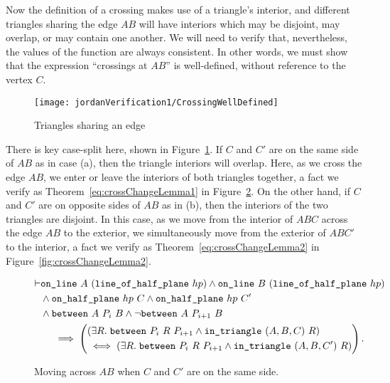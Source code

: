 Now the definition of a crossing makes use of a triangle's interior, and different triangles sharing the edge $AB$ will have interiors which may be disjoint, may overlap, or may contain one another. We will need to verify that, nevertheless, the values of the function  are always consistent. In other words, we must show that the expression ``crossings at $AB$'' is well-defined, without reference to the vertex $C$.

\begin{figure}
\centering\texttt{[image: jordanVerification1/CrossingWellDefined]}
\caption{Triangles sharing an edge}
\label{fig:CrossingWellDefined}
\end{figure}

There is key case-split here, shown in Figure~\ref{fig:CrossingWellDefined}. If $C$ and $C'$ are on the same side of $AB$ as in case (a), then the triangle interiors will overlap. Here, as we cross the edge $AB$, we enter or leave the interiors of both triangles together, a fact we verify as Theorem~\ref{eq:crossChangeLemma1} in Figure~\ref{fig:crossChangeLemma1}. On the other hand, if $C$ and $C'$ are on opposite sides of $AB$ as in (b), then the interiors of the two triangles are disjoint. In this case, as we move from the interior of $ABC$ across the edge $AB$ to the exterior, we simultaneously move from the exterior of $ABC'$ to the interior, a fact we verify as Theorem~\ref{eq:crossChangeLemma2} in Figure~\ref{fig:crossChangeLemma2}.

\begin{figure}
\begin{multline}\label{eq:crossChangeLemma1}
  \begin{aligned}
    \vdash&\texttt{on\_line}\ A\ (\texttt{line\_of\_half\_plane}\ hp) \wedge \texttt{on\_line}\ B\ (\texttt{line\_of\_half\_plane}\ hp)\\
    &\wedge\texttt{on\_half\_plane}\ hp\ C \wedge \texttt{on\_half\_plane}\ hp\ C'\\
    &\wedge\texttt{between}\ A\ P_i\ B \wedge \neg\texttt{between}\ A\ P_{i+1}\ B
  \end{aligned}\\
  \implies\left(\begin{aligned} 
      &(\exists R.\; \texttt{between}\ P_i\ R\ P_{i+1} \wedge \texttt{in\_triangle}\ (A,B,C)\ R)\\
      & \iff (\exists R.\; \texttt{between}\ P_i\ R\ P_{i+1} \wedge \texttt{in\_triangle}\ (A,B,C')\ R)
  \end{aligned}\right).
\end{multline}
\caption{Moving across $AB$ when $C$ and $C'$ are on the same side.}
\label{fig:crossChangeLemma1}
\end{figure}

